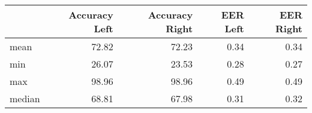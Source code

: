 \begin{tabular}{lrrrr}
\toprule
{} &  Accuracy Left &  Accuracy Right &  EER Left &  EER Right \\
\midrule
mean   &          72.82 &           72.23 &      0.34 &       0.34 \\
min    &          26.07 &           23.53 &      0.28 &       0.27 \\
max    &          98.96 &           98.96 &      0.49 &       0.49 \\
median &          68.81 &           67.98 &      0.31 &       0.32 \\
\bottomrule
\end{tabular}
